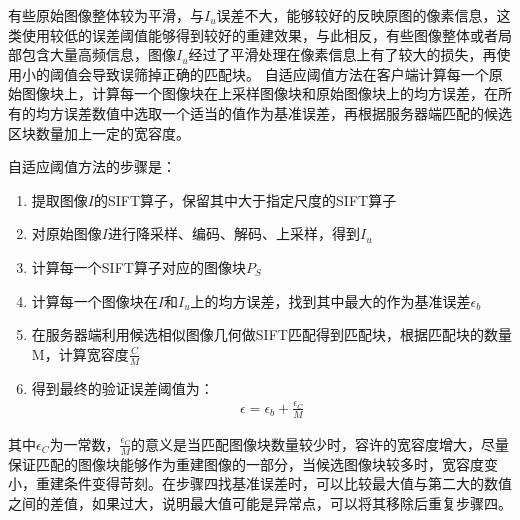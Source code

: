 有些原始图像整体较为平滑，与\(I_u\)误差不大，能够较好的反映原图的像素信息，这类使用较低的误差阈值能够得到较好的重建效果，与此相反，有些图像整体或者局部包含大量高频信息，图像\(I_u\)经过了平滑处理在像素信息上有了较大的损失，再使用小的阈值会导致误筛掉正确的匹配块。
自适应阈值方法在客户端计算每一个原始图像块上，计算每一个图像块在上采样图像块和原始图像块上的均方误差，在所有的均方误差数值中选取一个适当的值作为基准误差，再根据服务器端匹配的候选区块数量加上一定的宽容度。

自适应阈值方法的步骤是：
\begin{enumerate}
\item 提取图像\(I\)的SIFT算子，保留其中大于指定尺度的SIFT算子
\item 对原始图像\(I\)进行降采样、编码、解码、上采样，得到\(I_u\)
\item 计算每一个SIFT算子对应的图像块\(P_S\)
\item 计算每一个图像块在\(I\)和\(I_u\)上的均方误差，找到其中最大的作为基准误差\(\epsilon_b\)
\item 在服务器端利用候选相似图像几何做SIFT匹配得到匹配块，根据匹配块的数量M，计算宽容度\(\frac{C}{M}\)
\item 得到最终的验证误差阈值为：
\begin{align}
\epsilon = \epsilon_b + \frac{\epsilon_C}{M}
\end{align}
\end{enumerate}

其中\(\epsilon_C\)为一常数，\(\frac{\epsilon_C}{M}\)的意义是当匹配图像块数量较少时，容许的宽容度增大，尽量保证匹配的图像块能够作为重建图像的一部分，当候选图像块较多时，宽容度变小，重建条件变得苛刻。在步骤四找基准误差时，可以比较最大值与第二大的数值之间的差值，如果过大，说明最大值可能是异常点，可以将其移除后重复步骤四。



\ifx\usechapbib\empty
\nocite{BSTcontrol}


\fi
